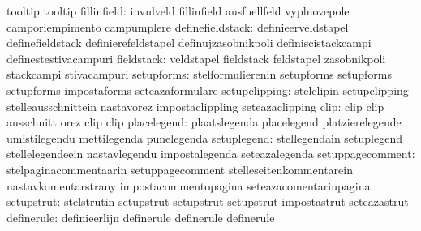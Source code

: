                                   tooltip                          tooltip %
                     fillinfield: invulveld                        fillinfield
                                  ausfuellfeld                     vyplnovepole
                                  camporiempimento                 campumplere
                definefieldstack: definieerveldstapel              definefieldstack
                                  definierefeldstapel              definujzasobnikpoli
                                  definiscistackcampi              definestestivacampuri %
                      fieldstack: veldstapel                       fieldstack
                                  feldstapel                       zasobnikpoli
                                  stackcampi                       stivacampuri
                      setupforms: stelformulierenin                setupforms
                                  setupforms                       setupforms
                                  impostaforms                     seteazaformulare %
                   setupclipping: stelclipin                       setupclipping
                                  stelleausschnittein              nastavorez
                                  impostaclippling                 seteazaclipping %
                            clip: clip                             clip
                                  ausschnitt                       orez
                                  clip                             clip
                     placelegend: plaatslegenda                    placelegend
                                  platzierelegende                 umistilegendu
                                  mettilegenda                     punelegenda
                     setuplegend: stellegendain                    setuplegend
                                  stellelegendeein                 nastavlegendu
                                  impostalegenda                   seteazalegenda
                setuppagecomment: stelpaginacommentaarin           setuppagecomment
                                  stelleseitenkommentarein         nastavkomentarstrany
                                  impostacommentopagina            seteazacomentariupagina
                      setupstrut: stelstrutin                      setupstrut
                                  setupstrut                       setupstrut
                                  impostastrut                     seteazastrut
                      definerule: definieerlijn                    definerule
                                  definerule                       definerule
